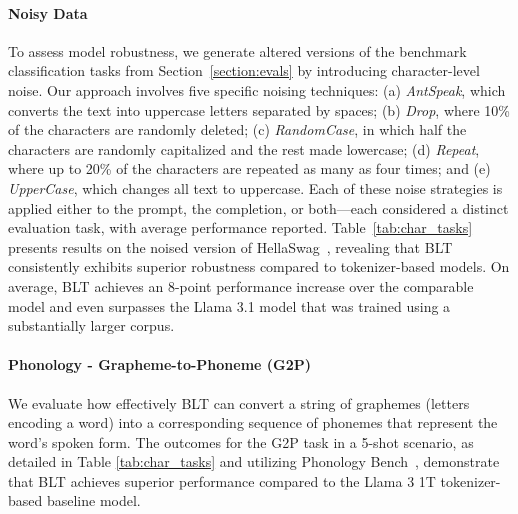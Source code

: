 \paragraph{Noisy Data} To assess model robustness, we generate altered versions of the benchmark classification tasks from Section~\ref{section:evals} by introducing character-level noise. Our approach involves five specific noising techniques: (a) \textit{AntSpeak}, which converts the text into uppercase letters separated by spaces; (b) \textit{Drop}, where 10\% of the characters are randomly deleted; (c) \textit{RandomCase}, in which half the characters are randomly capitalized and the rest made lowercase; (d) \textit{Repeat}, where up to 20\% of the characters are repeated as many as four times; and (e) \textit{UpperCase}, which changes all text to uppercase. Each of these noise strategies is applied either to the prompt, the completion, or both—each considered a distinct evaluation task, with average performance reported. Table~\ref{tab:char_tasks} presents results on the noised version of HellaSwag~\citep{Eval_hellaswag}, revealing that {\textsc BLT} consistently exhibits superior robustness compared to tokenizer-based models. On average, {\textsc BLT} achieves an 8-point performance increase over the comparable model and even surpasses the Llama 3.1 model that was trained using a substantially larger corpus.

\paragraph{Phonology - Grapheme-to-Phoneme (G2P)} We evaluate how effectively {\textsc BLT} can convert a string of graphemes (letters encoding a word) into a corresponding sequence of phonemes that represent the word's spoken form. The outcomes for the G2P task in a 5-shot scenario, as detailed in Table \ref{tab:char_tasks} and utilizing Phonology Bench~\citep{suvarna2024phonologybench}, demonstrate that {\textsc BLT} achieves superior performance compared to the Llama 3 1T tokenizer-based baseline model.


